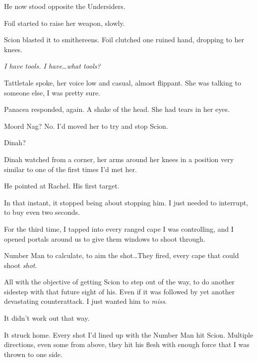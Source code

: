 He now stood opposite the Undersiders.



Foil started to raise her weapon, slowly.



Scion blasted it to smithereens.  Foil clutched one ruined hand, dropping to her knees.



\emph{I have tools.  I have\ldots what tools?}



Tattletale spoke, her voice low and casual, almost flippant.  She was talking to someone else, I was pretty sure.



Panacea responded, again.  A shake of the head.  She had tears in her eyes.



Moord Nag?  No.  I'd moved her to try and stop Scion.



Dinah?



Dinah watched from a corner, her arms around her knees in a position very similar to one of the first times I'd met her.



He pointed at Rachel.  His first target.



In that instant, it stopped being about stopping him.  I just needed to interrupt, to buy even two seconds.



For the third time, I tapped into every ranged cape I was controlling, and I opened portals around us to give them windows to shoot through.



Number Man to calculate, to aim the shot\ldots  They fired, every cape that could shoot \emph{shot}.



All with the objective of getting Scion to step out of the way, to do another sidestep with that future sight of his.  Even if it was followed by yet another devastating counterattack.  I just wanted him to \emph{miss}.



It didn't work out that way.



It struck home.  Every shot I'd lined up with the Number Man hit Scion.  Multiple directions, even some from above, they hit his flesh with enough force that I was thrown to one side.



